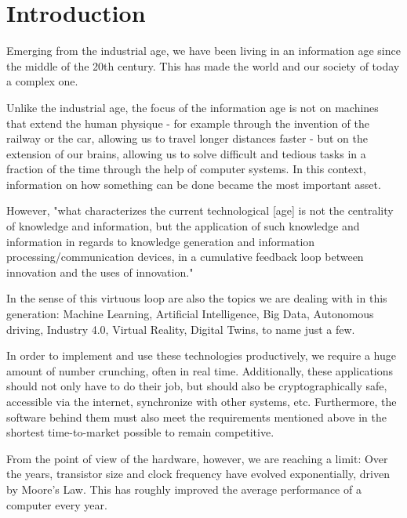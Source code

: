 \chapter{Introduction}\label{chapt:intro}

Emerging from the industrial age, we have been living in an information age since the middle of the 20th century. This has made the world and our society of today a complex one. \cite{Dietel2014} \cite{hauptSociety} 

Unlike the industrial age, the focus of the information age is not on machines that extend the human physique - for example through the invention of the railway or the car, allowing us to travel longer distances faster - but on the extension of our brains, allowing us to solve difficult and tedious tasks in a fraction of the time through the help of computer systems. \cite{Dietel2014} \cite{hauptSociety} In this context, information on how something can be done became the most important asset. \cite{Dietel2014}

However, "what characterizes the current technological [age] is not the centrality of knowledge and information, but the application of such knowledge and information in regards to knowledge generation and information processing/communication devices, in a cumulative feedback loop between innovation and the uses of innovation." \cite{castells_2012}

In the sense of this virtuous loop are also the topics we are dealing with in this generation: Machine Learning, Artificial Intelligence, Big Data, Autonomous driving, Industry 4.0, Virtual Reality, Digital Twins,  to name just a few.

In order to implement and use these technologies productively, we require a huge amount of number crunching, often in real time. Additionally, these applications should not only have to do their job, but should also be cryptographically safe, accessible via the internet, synchronize with other systems, etc. Furthermore, the software behind them must also meet the requirements mentioned above in the shortest time-to-market possible to remain competitive. \cite{timemarket} \cite{masterembedded}

\newpage

From the point of view of the hardware, however, we are reaching a limit: Over the years, transistor size and clock frequency have evolved exponentially, driven by Moore's Law. This has roughly improved the average performance of a computer every year. \cite{berger}

